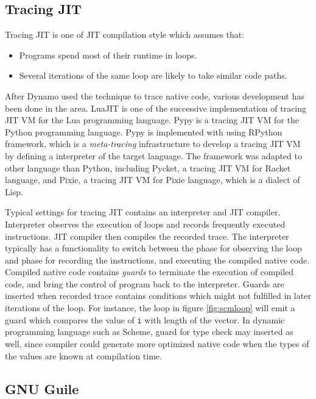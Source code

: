 \documentclass[preprint, numbers]{sigplanconf}
\begin{document}
\subsection{Tracing JIT}
Tracing JIT is one of JIT compilation style which assumes
that\cite{bolz2009tracing}:

\begin{itemize}
\item Programs spend most of their runtime in loops.
\item Several iterations of the same loop are likely to take similar code
  paths.
\end{itemize}

After Dynamo\cite{bala2000dynamo} used the technique to trace native code,
various development has been done in the area. LuaJIT\cite{pall2008luajit} is
one of the successive implementation of tracing JIT VM for the Lua programming
language. Pypy\cite{bolz2009tracing} is a tracing JIT VM for the Python
programming language. Pypy is implemented with using
RPython\cite{bolz2009tracing} framework, which is a \textit{meta-tracing}
infrastructure to develop a tracing JIT VM by defining a interpreter of the
target language. The framework was adapted to other language than Python,
including Pycket\citep{bauman2015pycket}, a tracing JIT VM for Racket
language, and Pixie\citep{baldridge2014pixie}, a tracing JIT VM for Pixie
language, which is a dialect of Lisp.

Typical settings for tracing JIT contains an interpreter and JIT
compiler. Interpreter observes the execution of loops and records frequently
executed instructions. JIT compiler then compiles the recorded trace. The
interpreter typically has a functionality to switch between the phase for
observing the loop and phase for recording the instructions, and executing the
compiled native code.  Compiled native code contains \textit{guards} to
terminate the execution of compiled code, and bring the control of program
back to the interpreter. Guards are inserted when recorded trace contains
conditions which might not fulfilled in later iterations of the loop. For
instance, the loop in figure \hyperref[fig:scmloop]{\ref{fig:scmloop}} will
emit a guard which compares the value of \texttt{i} with length of the
vector. In dynamic programming language such as Scheme, guard for type check
may inserted as well, since compiler could generate more optimized native code
when the types of the values are known at compilation time.

\subsection{GNU Guile}
\end{document}
